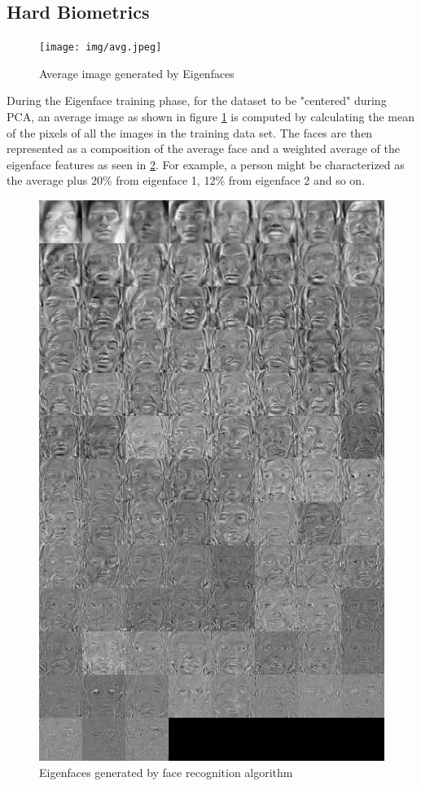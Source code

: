 \documentclass[12pt]{article}			%
\begin{document}
\subsection{Hard Biometrics}
\begin{figure}[h!]
	\centering
	\texttt{[image: img/avg.jpeg]}
	\caption{Average image generated by Eigenfaces}
	\label{fig:avg}
\end{figure}
During the Eigenface training phase, for the dataset to be "centered" during PCA, an average image as shown in figure \ref{fig:avg} is computed by calculating the mean of the pixels of all the images in the training data set. 
The faces are then represented as a composition of the average face and a weighted average of the eigenface features as seen in \ref{fig:eigen}.
For example, a person might be characterized as the average plus 20\% from eigenface 1, 12\% from eigenface 2 and so on.
\begin{figure}[h!]
	\centering
	\includegraphics[scale=0.15]{img/eigen.png}
	\caption{Eigenfaces generated by face recognition algorithm}
	\label{fig:eigen}
\end{figure}
\end{document}
